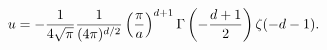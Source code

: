 \begin{equation}
u=-{1 \over {4 \sqrt \pi}}{1 \over (4 \pi)^{d/2}} \left({\pi \over a}\right)^{d+1} \Gamma \left(-{d+1 \over 2}\right) \zeta (-d-1).
\end{equation}

